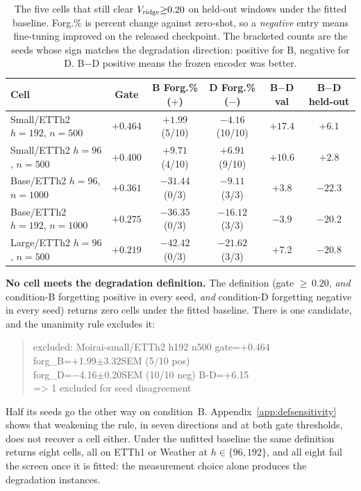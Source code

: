 \begin{table}[!htbp]
\centering\footnotesize
\caption{The five cells that still clear $V_{\text{ridge}}{\geq}0.20$ on
held-out windows under the fitted baseline. Forg.\% is percent change against
zero-shot, so a \emph{negative} entry means fine-tuning improved on the
released checkpoint. The bracketed counts are the seeds whose sign matches the
degradation direction: positive for B, negative for D. B$-$D positive means
the frozen encoder was better.}
\label{tab:gate_survivors}
\begin{tabular}{@{}lccccc@{}}
\toprule
Cell & Gate & B Forg.\% ($+$) & D Forg.\% ($-$) & B$-$D val & B$-$D held-out \\
\midrule
Small/ETTh2 $h{=}192$, $n{=}500$  & $+0.464$ & $+1.99$ (5/10)  & $-4.16$ (10/10) & $+17.4$ & $+6.1$ \\
Small/ETTh2 $h{=}96$, $n{=}500$   & $+0.400$ & $+9.71$ (4/10)  & $+6.91$ (9/10)  & $+10.6$ & $+2.8$ \\
Base/ETTh2 $h{=}96$, $n{=}1000$   & $+0.361$ & $-31.44$ (0/3)  & $-9.11$ (3/3)   & $+3.8$  & $-22.3$ \\
Base/ETTh2 $h{=}192$, $n{=}1000$  & $+0.275$ & $-36.35$ (0/3)  & $-16.12$ (3/3)  & $-3.9$  & $-20.2$ \\
Large/ETTh2 $h{=}96$, $n{=}500$   & $+0.219$ & $-42.42$ (0/3)  & $-21.62$ (3/3)  & $+7.2$  & $-20.8$ \\
\bottomrule
\end{tabular}
\end{table}

\textbf{No cell meets the degradation definition.}  The definition (gate
${\geq}\,0.20$, \emph{and} condition-B forgetting positive in every seed,
\emph{and} condition-D forgetting negative in every seed) returns zero cells
under the fitted baseline.  There is one candidate, and the unanimity rule
excludes it:

\begin{quote}\small\ttfamily
excluded: Moirai-small/ETTh2 h192 n500 \quad gate=+0.464\\
\hspace*{2em}forg\_B=+1.99$\pm$3.32SEM (5/10 pos)\\
\hspace*{2em}forg\_D=$-$4.16$\pm$0.20SEM (10/10 neg) \quad B-D=+6.15\\
=> 1 excluded for seed disagreement
\end{quote}

\noindent Half its seeds go the other way on condition~B.
Appendix~\ref{app:defsensitivity} shows that weakening the rule, in seven
directions and at both gate thresholds, does not recover a cell either.  Under
the unfitted baseline the same definition returns eight cells, all on ETTh1 or
Weather at $h{\in}\{96,192\}$, and all eight fail the screen once it is fitted:
the measurement choice alone produces the degradation instances.

